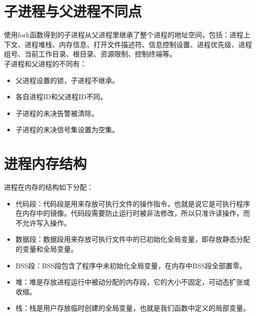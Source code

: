 \section{子进程与父进程不同点}
使用fork函数得到的子进程从父进程里继承了整个进程的地址空间，包括：进程上下文、进程堆栈、内存信息、打开文件描述符、信息控制设置、进程优先级、进程组号、当前工作目录、根目录、资源限制、控制终端等。\\
子进程和父进程的不同有：
\begin{itemize}
\item 父进程设置的锁，子进程不继承。
\item 各自进程ID和父进程ID不同。
\item 子进程的未决告警被清除。
\item 子进程的末决信号集设置为空集。 
\end{itemize}
\section{进程内存结构}
进程在内存的结构如下分配：
\begin{itemize}
\item 代码段：代码段是用来存放可执行文件的操作指令，也就是说它是可执行程序在内存中的镜像。代码段需要防止运行时被非法修改，所以只准许读操作，而不允许写入操作。
\item 数据段：数据段用来存放可执行文件中的已初始化全局变量，即存放静态分配的变量和全局变量。
\item BSS段：BSS段包含了程序中未初始化全局变量，在内存中BSS段全部置零。
\item 堆：堆是存放进程运行中被动分配的内存段，它的大小不固定，可动态扩张或收缩。
\item 栈：栈是用户存放临时创建的全局变量，也就是我们函数中定义的局部变量。
\end{itemize}

